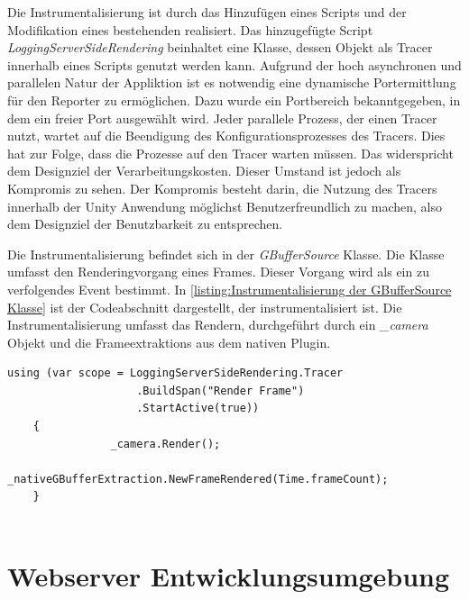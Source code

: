 Die Instrumentalisierung ist durch das Hinzufügen eines Scripts und der Modifikation eines bestehenden realisiert.
Das hinzugefügte Script \emph{LoggingServerSideRendering} beinhaltet eine Klasse, dessen Objekt als Tracer innerhalb eines Scripts genutzt werden kann.
Aufgrund der hoch asynchronen und parallelen Natur der Appliktion ist es notwendig eine dynamische Portermittlung für den Reporter zu ermöglichen.
Dazu wurde ein Portbereich bekanntgegeben, in dem ein freier Port ausgewählt wird.
Jeder parallele Prozess, der einen Tracer nutzt, wartet auf die Beendigung des Konfigurationsprozesses des Tracers.
Dies hat zur Folge, dass die Prozesse auf den Tracer warten müssen.
Das widerspricht dem Designziel der Verarbeitungskosten. Dieser Umstand ist jedoch als Kompromis zu sehen. Der Kompromis besteht darin, die Nutzung des Tracers innerhalb der Unity Anwendung möglichst Benutzerfreundlich zu machen, also dem Designziel der Benutzbarkeit zu entsprechen.

Die Instrumentalisierung befindet sich in der \emph{GBufferSource} Klasse.
Die Klasse umfasst den Renderingvorgang eines Frames. 
Dieser Vorgang wird als ein zu verfolgendes Event bestimmt.
In \cref{listing:Instrumentalisierung der GBufferSource Klasse} ist der Codeabschnitt dargestellt, der instrumentalisiert ist.
Die Instrumentalisierung umfasst das Rendern, durchgeführt durch ein \emph{\_camera} Objekt und die Frameextraktions aus dem nativen Plugin.


\begin{minipage}[]{\textwidth}
	\begin{lstlisting}[frame=trBL]
	using (var scope = LoggingServerSideRendering.Tracer
					.BuildSpan("Render Frame")
					.StartActive(true))
	{
				_camera.Render();
				_nativeGBufferExtraction.NewFrameRendered(Time.frameCount);
	}
	
	\end{lstlisting}
	\label{listing:Instrumentalisierung der GBufferSource Klasse}
\end{minipage}

\section{ Webserver Entwicklungsumgebung }
\label{section:Webserver Entwicklungsumgebung}

